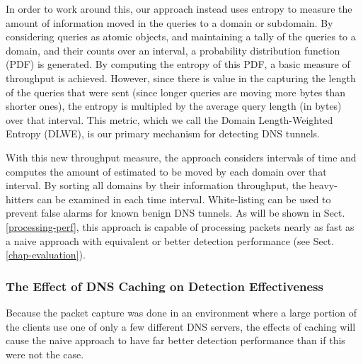\documentclass{llncs}
\begin{document}
In order to work around this, our approach instead uses entropy to
measure the amount of information moved in the queries to a domain or
subdomain. By considering queries as atomic objects, and maintaining a
tally of the queries to a domain, and their counts over an interval, a
probability distribution function (PDF) is generated. By computing the
entropy of this PDF, a basic measure of throughput is
achieved. However, since there is value in the capturing the length of
the queries that were sent (since longer queries are moving more bytes
than shorter ones), the entropy is multipled by the average query
length (in bytes) over that interval. This metric, which we call the
Domain Length-Weighted Entropy (DLWE), is our primary mechanism for
detecting DNS tunnels.

With this new throughput measure, the approach considers intervals of
time and computes the amount of estimated to be moved by each domain
over that interval. By sorting all domains by their information
throughput, the heavy-hitters can be examined in each time interval.
White-listing can be used to prevent false alarms for known benign DNS
tunnels. As will be shown in Sect. \ref{processing-perf}, this
approach is capable of processing packets nearly as fast as a naive
approach with equivalent or better detection performance (see
Sect. \ref{chap-evaluation}).

\subsubsection{The Effect of DNS Caching on Detection Effectiveness}
\label{dns-caching}

Because the packet capture was done in an environment where a large
portion of the clients use one of only a few different DNS servers,
the effects of caching will cause the naive approach to have far
better detection performance than if this were not the case.
\end{document}
